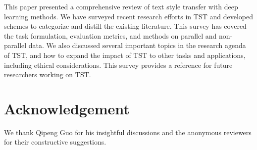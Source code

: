 \label{sec:conclusion}
This paper presented a comprehensive review of text style transfer with deep learning methods. We have surveyed recent research efforts in TST and developed schemes to categorize and distill the existing literature. This survey has covered the task formulation, evaluation metrics, and methods on parallel and non-parallel data. We also discussed several important topics in the research agenda of TST, and how to expand the impact of TST to other tasks and applications, including ethical considerations. This survey provides a reference for future researchers working on TST.
\section*{Acknowledgement}
We thank Qipeng Guo for his insightful discussions and the anonymous reviewers for their constructive suggestions.
\starttwocolumn

